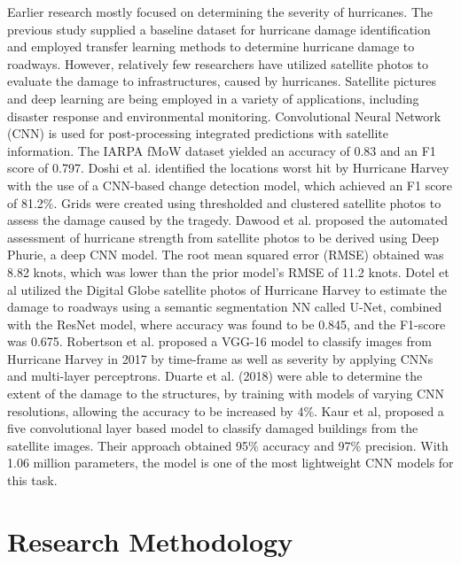 \documentclass[conference]{IEEEtran}
\begin{document}
Earlier research mostly focused on determining the severity of hurricanes. The previous study supplied a baseline dataset for hurricane damage identification and employed transfer learning methods to determine hurricane damage to roadways. However, relatively few researchers have utilized satellite photos to evaluate the damage to infrastructures, caused by hurricanes. Satellite pictures and deep learning are being employed in a variety of applications, including disaster response and environmental monitoring. Convolutional Neural Network (CNN) is used for post-processing integrated predictions with satellite information. The IARPA fMoW dataset\cite{8457969} yielded an accuracy of 0.83 and an F1 score of 0.797. Doshi et al.\cite{https://doi.org/10.48550/arxiv.1812.07033} identified the locations worst hit by Hurricane Harvey with the use of a CNN-based change detection model, which achieved an F1 score of 81.2\%. Grids were created using thresholded and clustered satellite photos to assess the damage caused by the tragedy. Dawood et al. \cite{dawood_deep-phurie:_2020} proposed the automated assessment of hurricane strength from satellite photos to be derived using Deep Phurie, a deep CNN model. The root mean squared error (RMSE) obtained was 8.82 knots, which was lower than the prior model's RMSE of 11.2 knots. Dotel et al \cite{inproceedings} utilized the Digital Globe satellite photos of Hurricane Harvey to estimate the damage to roadways using a semantic segmentation NN called U-Net, combined with the ResNet model, where accuracy was found to be 0.845, and the F1-score was 0.675. Robertson et al. \cite{ROBERTSON2019100030} proposed a VGG-16 model to classify images from Hurricane Harvey in 2017 by time-frame as well as severity by applying CNNs and multi-layer perceptrons. Duarte et al. (2018) \cite{isprs-annals-IV-2-89-2018} were able to determine the extent of the damage to the structures, by training with models of varying CNN resolutions, allowing the accuracy to be increased by 4\%. Kaur et al, \cite{kaur_convolutional_2022} proposed a five convolutional layer based model to classify damaged buildings from the satellite images. Their approach obtained 95\% accuracy and 97\% precision. With 1.06 million parameters, the model is one of the most lightweight CNN models for this task.

\section{Research Methodology}
\label{method} 
\end{document}
